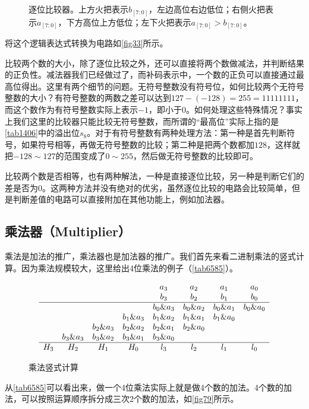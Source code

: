\begin{figure}
\centering
{}%
%
\caption{逐位比较器。上方火把表示$b_{[7:0]}$，左边高位右边低位；右侧火把表示$a_{[7:0]}$，下方高位上方低位；左下火把表示$a_{[7:0]}\mathtt{>}b_{[7:0]}$。}\label{fig33}
\end{figure}
将这个逻辑表达式转换为电路如\autoref{fig33}所示。

比较两个数的大小，除了逐位比较之外，还可以直接将两个数做减法，并判断结果的正负性。减法器我们已经做过了，而补码表示中，一个数的正负可以直接通过最高位得出。这里有两个细节的问题。无符号整数没有符号位，如何比较两个无符号整数的大小？有符号整数的两数之差可以达到$127-(-128)=255=11111111$，而这个数作为有符号整数实际上表示$-1$，即小于0。如何处理这些特殊情况？事实上我们这里的比较器只能比较无符号整数，而所谓的“最高位”实际上指的是\autoref{tab1406}中的溢出位$s_8$。对于有符号整数有两种处理方法：第一种是首先判断符号，如果符号相等，再做无符号整数的比较；第二种是把两个数都加$128$，这样就把$-128\sim127$的范围变成了$0\sim255$，然后做无符号整数的比较即可。

比较两个数是否相等，也有两种解法，一种是直接逐位比较，另一种是判断它们的差是否为0。这两种方法并没有绝对的优劣，虽然逐位比较的电路会比较简单，但是判断差值的电路可以直接附加在其他功能上，例如加法器。

\subsection{乘法器（Multiplier）}
乘法是加法的推广，乘法器也是加法器的推广。我们首先来看二进制乘法的竖式计算。因为乘法规模较大，这里给出4位乘法的例子（\autoref{tab6585}）。

\begin{figure}[!ht]
$$
\begin{array}{ccccccccc}
&&&&a_3&a_2&a_1&a_0\\
&&&&b_3&b_2&b_1&b_0\\\hline
&&&&b_0\&a_3&b_0\&a_2&b_0\&a_1&b_0\&a_0\\
&&&b_1\&a_3&b_1\&a_2&b_1\&a_1&b_1\&a_0\\
&&b_2\&a_3&b_2\&a_2&b_2\&a_1&b_2\&a_0\\
&b_3\&a_3&b_3\&a_2&b_3\&a_1&b_3\&a_0\\\hline
H_3&H_2&H_1&H_0&l_3&l_2&l_1&l_0
\end{array}
$$
\caption{乘法竖式计算}\label{tab6585}
\end{figure}

从\autoref{tab6585}可以看出来，做一个4位乘法实际上就是做4个数的加法。4个数的加法，可以按照运算顺序拆分成三次2个数的加法，如\autoref{fig79}所示。

